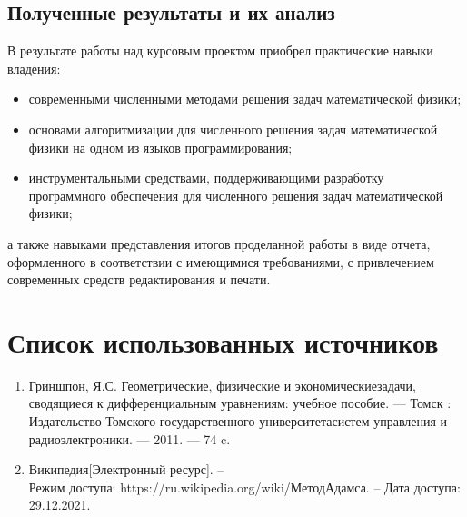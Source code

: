\documentclass[a4paper,fleqn,14pt,titlepage]{extarticle}
\begin{document}
	\subsection{Полученные результаты и их анализ}
	В результате работы над курсовым проектом приобрел практические навыки владения:
	\begin{itemize}
		\item современными численными методами решения задач математической физики;
		\item основами алгоритмизации для численного решения задач математической физики на одном из языков программирования;
		\item инструментальными средствами, поддерживающими разработку программного обеспечения для численного решения задач математической физики;
	\end{itemize}
	а также навыками представления итогов проделанной работы в виде отчета, оформленного в соответствии с имеющимися требованиями, с привлечением современных средств редактирования и печати.
	\pagebreak
	\section{Список использованных источников}
		\begin{enumerate}
			\item Гриншпон, Я.С.  Геометрические, физические и экономическиезадачи, сводящиеся к дифференциальным уравнениям: учебное пособие. --- Томск : Издательство Томского государственного университетасистем управления и радиоэлектроники. --- 2011. --- 74 c.
			\item Википедия[Электронный ресурс]. – \\
			Режим доступа: https://ru.wikipedia.org/wiki/МетодАдамса. – Дата доступа: 29.12.2021.
		\end{enumerate}
		\pagebreak
\end{document}
